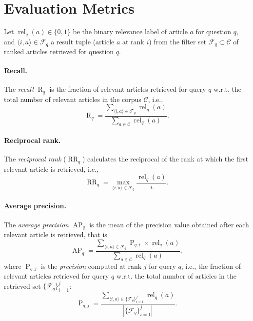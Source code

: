 \documentclass[11pt]{article}
\begin{document}
\section{Evaluation Metrics \label{app:evaluation_metrics}}
Let $\operatorname{rel}_{q}(a) \in \{0,1\}$ be the binary relevance label of article $a$ for question $q$, and $\langle i, a\rangle \in \mathcal{F}_q$ a result tuple (article $a$ at rank $i$) from the filter set $\mathcal{F}_q \subset \mathcal{C}$ of ranked articles retrieved for question $q$.

\paragraph{Recall.}
The \textit{recall} $\operatorname{R}_{q}$ is the fraction of relevant articles retrieved for query $q$ w.r.t. the total number of relevant articles in the corpus $\mathcal{C}$, i.e.,
\begin{equation}
    \operatorname{R}_{q}=\frac{\sum_{\langle i, a\rangle \in \mathcal{F}_q} \operatorname{rel}_{q}(a)}{\sum_{a \in \mathcal{C}} \operatorname{rel}_{q}(a)}.
\end{equation}

\paragraph{Reciprocal rank.}
The \textit{reciprocal rank} ($\operatorname{RR}_{q}$) calculates the reciprocal of the rank at which the first relevant article is retrieved, i.e.,
\begin{equation}
    \operatorname{RR}_{q}=\max _{\langle i, a\rangle \in \mathcal{F}_q} \frac{\operatorname{rel}_{q}(a)}{i}.
\end{equation}

\paragraph{Average precision.}
The \textit{average precision} $\operatorname{AP}_{q}$ is the mean of the precision value obtained after each relevant article is retrieved, that is
\begin{equation}
    \operatorname{AP}_{q}=\frac{\sum_{\langle i, a\rangle \in \mathcal{F}_q} \operatorname{P}_{q, i} \times \operatorname{rel}_{q}(a)}{\sum_{a \in \mathcal{C}} \operatorname{rel}_{q}(a)},
\end{equation}
where $\operatorname{P}_{q, j}$ is the \textit{precision} computed at rank $j$ for query $q$, i.e., the fraction of relevant articles retrieved for query $q$ w.r.t. the total number of articles in the retrieved set $\{\mathcal{F}_q\}_{i=1}^{j}$:
\begin{equation}
    \operatorname{P}_{q, j}=\frac{\sum_{\langle i, a\rangle \in \{\mathcal{F}_q\}_{i=1}^{j}} \operatorname{rel}_{q}(a)}{\left|\{\mathcal{F}_q\}_{i=1}^{j}\right|}.
\end{equation}
\end{document}
